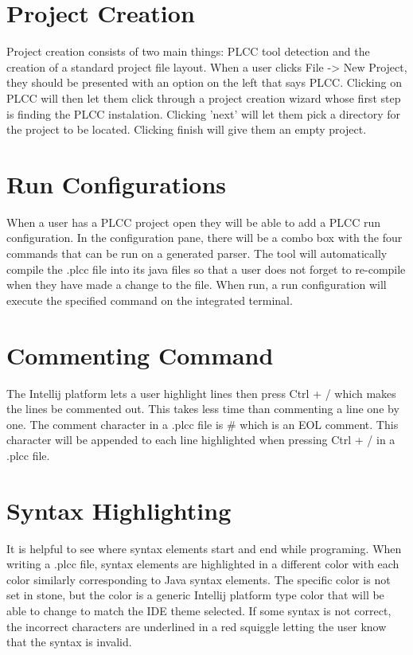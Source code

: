 \documentclass[12pt]{article}
\begin{document}
{\section{Project Creation}
Project creation consists of two main things: PLCC tool detection and the creation of a standard project file layout.
When a user clicks File -> New Project, they should be presented with an option on the left that says PLCC.
Clicking on PLCC will then let them click through a project creation wizard whose first step is finding the PLCC instalation.
Clicking 'next' will let them pick a directory for the project to be located.
Clicking finish will give them an empty project.

\section{Run Configurations}
When a user has a PLCC project open they will be able to add a PLCC run configuration.
In the configuration pane, there will be a combo box with the four commands that can be run on a generated parser.
The tool will automatically compile the .plcc file into its java files so that a user does not forget to re-compile when they have made a change to the file.
When run, a run configuration will execute the specified command on the integrated terminal.

\section{Commenting Command}
The Intellij platform lets a user highlight lines then press Ctrl + / which makes the lines be commented out.
This takes less time than commenting a line one by one.
The comment character in a .plcc file is \# which is an EOL comment.
This character will be appended to each line highlighted when pressing Ctrl + / in a .plcc file.

\section{Syntax Highlighting}
It is helpful to see where syntax elements start and end while programing.
When writing a .plcc file, syntax elements are highlighted in a different color with each color similarly corresponding to Java syntax elements.
The specific color is not set in stone, but the color is a generic Intellij platform type color that will be able to change to match the IDE theme selected.
If some syntax is not correct, the incorrect characters are underlined in a red squiggle letting the user know that the syntax is invalid.

}
\end{document}
